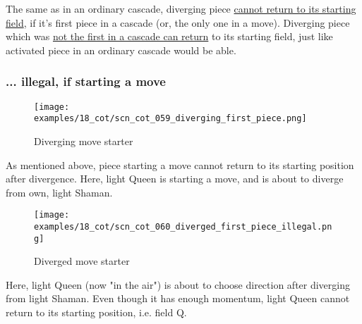 \vspace*{-0.7\baselineskip}
The same as in an ordinary cascade, diverging piece
\hyperref[fig:scn_mv_53_static_move_is_illegal_init]{cannot return to its starting field},
if it's first piece in a cascade (or, the only one in a move). Diverging piece which was
\hyperref[fig:scn_mv_55_static_piece_is_legal_init]{not the first in a cascade can return}
to its starting field, just like activated piece in an ordinary cascade would be able.

\vspace*{-0.7\baselineskip}
\subsubsection*{... illegal, if starting a move}
\label{sec:Conquest of Tlalocan/Divergence/Diverging to starting position/... illegal, if starting a move}

\vspace*{-0.9\baselineskip}
\noindent
\begin{wrapfigure}[6]{l}{0.4\textwidth}
\centering
\texttt{[image: examples/18\_cot/scn\_cot\_059\_diverging\_first\_piece.png]}
\vspace*{-0.4\baselineskip}
\caption{Diverging move starter}
\label{fig:scn_cot_059_diverging_first_piece}
\end{wrapfigure}
As mentioned above, piece starting a move cannot return to its starting position
after divergence.\newline
\indent
Here, light Queen is starting a move, and is about to diverge from own, light Shaman.

\vspace*{3.9\baselineskip}
\noindent
\begin{wrapfigure}[6]{l}{0.4\textwidth}
\centering
\texttt{[image: examples/18\_cot/scn\_cot\_060\_diverged\_first\_piece\_illegal.png]}
\vspace*{-0.4\baselineskip}
\caption{Diverged move starter}
\label{fig:scn_cot_060_diverged_first_piece_illegal}
\end{wrapfigure}
Here, light Queen (now "in the air") is about to choose direction after diverging
from light Shaman. Even though it has enough momentum, light Queen cannot return
to its starting position, i.e. field Q.

\clearpage %


